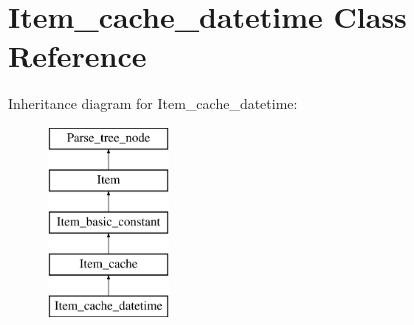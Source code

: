 \hypertarget{classItem__cache__datetime}{}\section{Item\+\_\+cache\+\_\+datetime Class Reference}
\label{classItem__cache__datetime}
Inheritance diagram for Item\+\_\+cache\+\_\+datetime\+:\begin{figure}[H]
\begin{center}
\leavevmode
\includegraphics[height=5.000000cm]{classItem__cache__datetime}
\end{center}
\end{figure}
